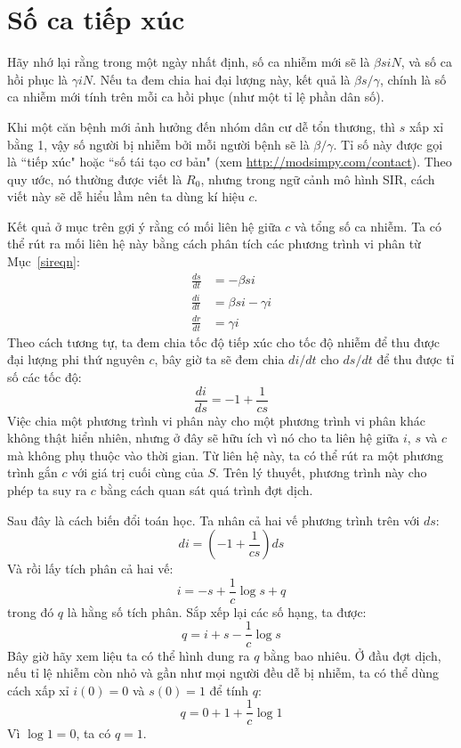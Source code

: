 \documentclass[12pt]{book}
\theoremstyle{exercise}
\begin{document}
\section{Số ca tiếp xúc}
\label{contact}

Hãy nhớ lại rằng trong một ngày nhất định, số ca nhiễm mới sẽ là $\beta s i N$, và số ca hồi phục là $\gamma i N$.  Nếu ta đem chia hai đại lượng này, kết quả là $\beta s / \gamma$, chính là số ca nhiễm mới tính trên mỗi ca hồi phục (như một tỉ lệ phần dân số).


Khi một căn bệnh mới ảnh hưởng đến nhóm dân cư dễ tổn thương, thì $s$ xấp xỉ bằng 1, vậy số người bị nhiễm bởi mỗi người bệnh sẽ là $\beta / \gamma$.  Tỉ số này được gọi là ``tiếp xúc" hoặc ``số tái tạo cơ bản" (xem \url{http://modsimpy.com/contact}).  Theo quy ước, nó thường được viết là $R_0$, nhưng trong ngữ cảnh mô hình SIR, cách viết này sẽ dễ hiểu lầm nên ta dùng kí hiệu $c$.

Kết quả ở mục trên gợi ý rằng có mối liên hệ giữa $c$ và tổng số ca nhiễm. Ta có thể rút ra mối liên hệ này bằng cách phân tích các phương trình vi phân từ Mục~\ref{sireqn}:
%
\begin{align*}
\frac{ds}{dt} &= -\beta s i \\
\frac{di}{dt} &= \beta s i - \gamma i\\
\frac{dr}{dt} &= \gamma i
\end{align*}
%
Theo cách tương tự, ta đem chia tốc độ tiếp xúc cho tốc độ nhiễm để thu được đại lượng phi thứ nguyên $c$, bây giờ ta sẽ đem chia $di/dt$ cho $ds/dt$ để thu được tỉ số các tốc độ:
%
\[ \frac{di}{ds} = -1 + \frac{1}{cs} \]
%
Việc chia một phương trình vi phân này cho một phương trình vi phân khác không thật hiển nhiên, nhưng ở đây sẽ hữu ích vì nó cho ta liên hệ giữa $i$, $s$ và $c$ mà không phụ thuộc vào thời gian. Từ liên hệ này, ta có thể rút ra một phương trình gắn $c$ với giá trị cuối cùng của $S$.  Trên lý thuyết, phương trình này cho phép ta suy ra $c$ bằng cách quan sát quá trình đợt dịch.

Sau đây là cách biến đổi toán học. Ta nhân cả hai vế phương trình trên với $ds$:
%
\[ di = \left( -1 + \frac{1}{cs} \right) ds \]
%
Và rồi lấy tích phân cả hai vế:
%
\[ i = -s + \frac{1}{c} \log s + q \]
%
trong đó $q$ là hằng số tích phân. Sắp xếp lại các số hạng, ta được:
%
\[ q = i + s - \frac{1}{c} \log s \]
%
Bây giờ hãy xem liệu ta có thể hình dung ra $q$ bằng bao nhiêu. Ở đầu đợt dịch, nếu tỉ lệ nhiễm còn nhỏ và gần như mọi người đều dễ bị nhiễm, ta có thể dùng cách xấp xỉ $i(0) = 0$ và $s(0) = 1$ để tính $q$:
%
\[ q = 0 + 1 + \frac{1}{c} \log 1 \]
%
Vì $\log 1 = 0$, ta có $q = 1$.
\end{document}
